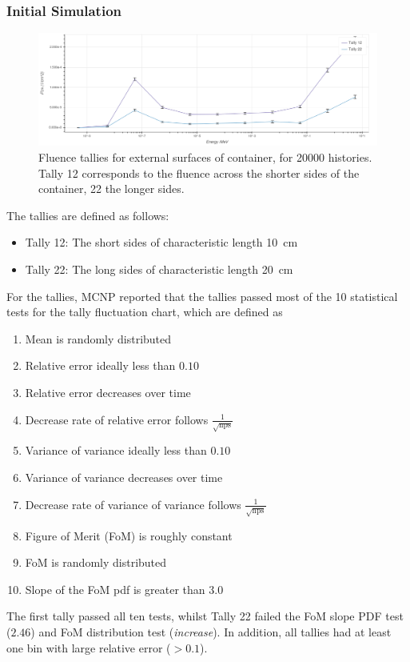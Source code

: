 \documentclass{article}
\begin{document}
    \subsubsection{Initial Simulation}
      \begin{figure}[htb]
        \includegraphics[width=\textwidth]{tallies_20k.png}
        \caption{Fluence tallies for external surfaces of container, for \num{20000} histories. Tally 12 corresponds to the fluence across the shorter sides of the container, 22 the longer sides.}
        \label{fig:tallies_20000}
      \end{figure}

    The tallies are defined as follows:
    \begin{itemize}
      \item Tally 12: The short sides of characteristic length \SI{10}{\cm}
      \item Tally 22: The long sides of characteristic length \SI{20}{\cm}
    \end{itemize}

    For the tallies, MCNP reported that the tallies passed most of the 10 statistical tests for the tally fluctuation chart, which are defined as
    \begin{enumerate}
      \item Mean is randomly distributed
      \item Relative error ideally less than $0.10$
      \item Relative error decreases over time
      \item Decrease rate of relative error follows $\frac{1}{\sqrt{\text{nps}}}$
      \item Variance of variance ideally less than $0.10$
      \item Variance of variance decreases over time
      \item Decrease rate of variance of variance follows $\frac{1}{\sqrt{\text{nps}}}$
      \item Figure of Merit (FoM) is roughly constant
      \item FoM is randomly distributed
      \item Slope of the FoM pdf is greater than $3.0$
    \end{enumerate}
    The first tally passed all ten tests, whilst Tally 22 failed the FoM slope PDF test ($2.46$) and FoM distribution test (\textit{increase}). In addition, all tallies had at least one bin with large relative error ($>0.1$).
\end{document}
